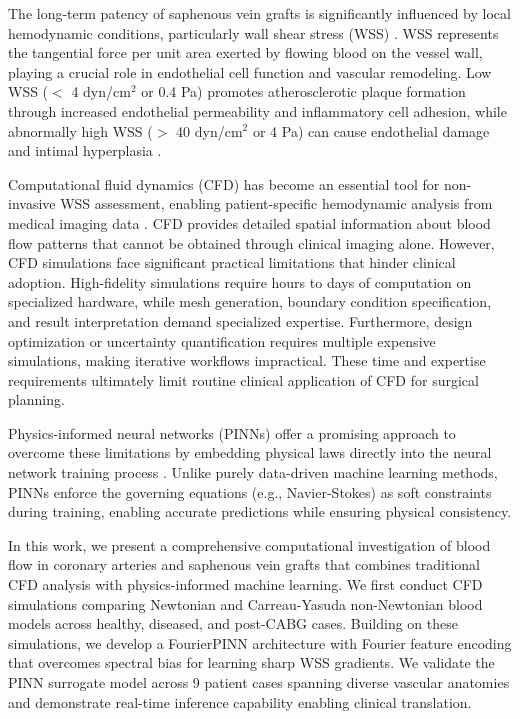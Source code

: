\documentclass[12pt,a4paper]{article}
\begin{document}
The long-term patency of saphenous vein grafts is significantly influenced by local hemodynamic conditions, particularly wall shear stress (WSS) \cite{wss_graft_failure}. WSS represents the tangential force per unit area exerted by flowing blood on the vessel wall, playing a crucial role in endothelial cell function and vascular remodeling. Low WSS ($<$ 4 dyn/cm$^2$ or 0.4 Pa) promotes atherosclerotic plaque formation through increased endothelial permeability and inflammatory cell adhesion, while abnormally high WSS ($>$ 40 dyn/cm$^2$ or 4 Pa) can cause endothelial damage and intimal hyperplasia \cite{wss_thresholds}.

Computational fluid dynamics (CFD) has become an essential tool for non-invasive WSS assessment, enabling patient-specific hemodynamic analysis from medical imaging data \cite{cfd_coronary}. CFD provides detailed spatial information about blood flow patterns that cannot be obtained through clinical imaging alone. However, CFD simulations face significant practical limitations that hinder clinical adoption. High-fidelity simulations require hours to days of computation on specialized hardware, while mesh generation, boundary condition specification, and result interpretation demand specialized expertise. Furthermore, design optimization or uncertainty quantification requires multiple expensive simulations, making iterative workflows impractical. These time and expertise requirements ultimately limit routine clinical application of CFD for surgical planning.

Physics-informed neural networks (PINNs) offer a promising approach to overcome these limitations by embedding physical laws directly into the neural network training process \cite{raissi2019physics}. Unlike purely data-driven machine learning methods, PINNs enforce the governing equations (e.g., Navier-Stokes) as soft constraints during training, enabling accurate predictions while ensuring physical consistency.

In this work, we present a comprehensive computational investigation of blood flow in coronary arteries and saphenous vein grafts that combines traditional CFD analysis with physics-informed machine learning. We first conduct CFD simulations comparing Newtonian and Carreau-Yasuda non-Newtonian blood models across healthy, diseased, and post-CABG cases. Building on these simulations, we develop a FourierPINN architecture with Fourier feature encoding that overcomes spectral bias for learning sharp WSS gradients. We validate the PINN surrogate model across 9 patient cases spanning diverse vascular anatomies and demonstrate real-time inference capability enabling clinical translation.
\end{document}
